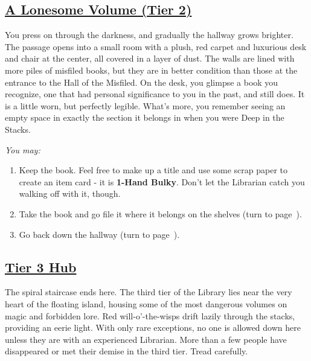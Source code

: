 \documentclass[sheet]{GL2020}
\begin{document}
\clearpage

\begin{center}\section*{\underline{A Lonesome Volume (Tier 2)}}\end{center}
\label{LonesomeVolume}

You press on through the darkness, and gradually the hallway grows brighter. The passage opens into a small room with a plush, red carpet and luxurious desk and chair at the center, all covered in a layer of dust. The walls are lined with more piles of misfiled books, but they are in better condition than those at the entrance to the Hall of the Misfiled. On the desk, you glimpse a book you recognize, one that had personal significance to you in the past, and still does. It is a little worn, but perfectly legible. What’s more, you remember seeing an empty space in exactly the section it belongs in when you were Deep in the Stacks.

\vspace{0.5cm}

\begingroup
\itshape
You may:
\begin{enumerate}[A]
  \item Keep the book. Feel free to make up a title and use some scrap paper to create an item card - it is \textbf{1-Hand Bulky}. Don’t let the Librarian catch you walking off with it, though.
	\item Take the book and go file it where it belongs on the shelves (turn to page~\pageref{RestoredRightfulPlace}).
	\item Go back down the hallway (turn to page~\pageref{HallMisfiled}).
\end{enumerate}
\endgroup

\clearpage



\begin{center}\section*{\underline{Tier 3 Hub}}\end{center}
\label{TierThreeHub}

The spiral staircase ends here. The third tier of the Library lies near the very heart of the floating island, housing some of the most dangerous volumes on magic and forbidden lore. Red will-o’-the-wisps drift lazily through the stacks, providing an eerie light. With only rare exceptions, no one is allowed down here unless they are with an experienced Librarian. More than a few people have disappeared or met their demise in the third tier. Tread carefully. 
\end{document}
